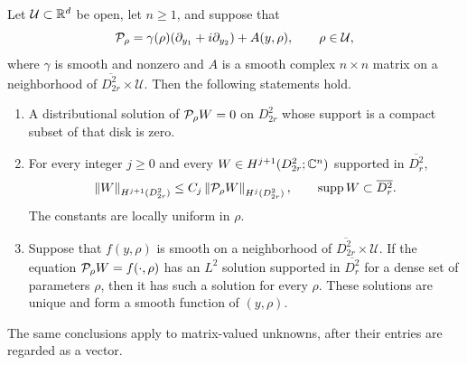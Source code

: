 \begin{lemma}\label{lem:supported-transport}
Let $\mathcal U\subset\mathbb R^d$ be open, let $n\geq1$, and suppose that
\[
 \mathcal P_\rho
   =\gamma(\rho)(\partial_{y_1}+i\partial_{y_2})
       +A(y,\rho),
 \qquad \rho\in\mathcal U,
\]
where $\gamma$ is smooth and nonzero and $A$ is a smooth complex
$n\times n$ matrix on a neighborhood of
$\overline{D_{2r}^2}\times\mathcal U$. Then the following statements hold.
\begin{enumerate}[label=\textup{(\roman*)}]
\item A distributional solution of $\mathcal P_\rho W=0$ on $D_{2r}^2$
whose support is a compact subset of that disk is zero.
\item For every integer $j\geq0$ and every
$W\in H^{j+1}(D_{2r}^2;\mathbb C^n)$ supported in $\overline{D_r^2}$,
\begin{equation}\label{eq:supported-transport-estimate}
 \left\lVert W\right\rVert_{H^{j+1}(D_{2r}^2)}
 \leq C_j\left\lVert \mathcal P_\rho W\right\rVert_{H^j(D_{2r}^2)},
 \qquad
 \operatorname{supp} W\subset\overline{D_r^2}.
\end{equation}
The constants are locally uniform in $\rho$.
\item Suppose that $f(y,\rho)$ is smooth on a neighborhood of
$\overline{D_{2r}^2}\times\mathcal U$. If the equation
$\mathcal P_\rho W=f(\cdot,\rho)$ has an $L^2$ solution supported in
$\overline{D_r^2}$ for a dense set of parameters $\rho$, then it has
such a solution for every $\rho$. These solutions are unique and form
a smooth function of $(y,\rho)$.
\end{enumerate}
The same conclusions apply to matrix-valued unknowns, after their
entries are regarded as a vector.
\end{lemma}


